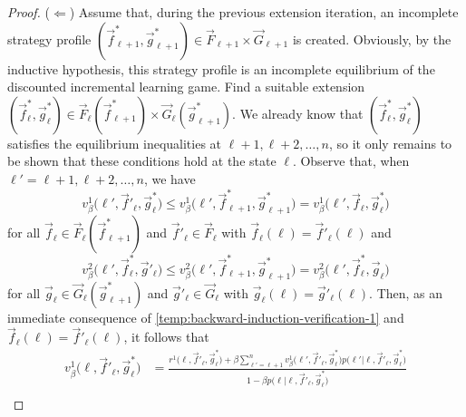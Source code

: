 \begin{proof}
        ($\Longleftarrow$)
        Assume that, during the previous extension iteration, an incomplete strategy profile $(\vec{f}^*_{\ell + 1}, \vec{g}^*_{\ell + 1}) \in \vec{F}_{\ell + 1} \times \vec{G}_{\ell + 1}$ is created.
        Obviously, by the inductive hypothesis, this strategy profile is an incomplete equilibrium of the discounted incremental learning game.
        Find a suitable extension $(\vec{f}^*_\ell, \vec{g}^*_\ell) \in \vec{F}_\ell(\vec{f}^*_{\ell + 1}) \times \vec{G}_\ell(\vec{g}^*_{\ell + 1})$.
        We already know that $(\vec{f}^*_\ell, \vec{g}^*_\ell)$ satisfies the equilibrium inequalities at $\ell + 1, \ell + 2, \ldots, n$, so it only remains to be shown that these conditions hold at the state $\ell$.
        Observe that, when $\ell' = \ell + 1, \ell + 2, \ldots, n$, we have
        \begin{equation}  \label{temp:backward-induction-verification-1}
            v^1_\beta\big(\ell', \vec{f}'_\ell, \vec{g}^*_\ell\big)
                \le v^1_\beta\big(\ell', \vec{f}^*_{\ell + 1}, \vec{g}^*_{\ell + 1}\big)
                = v^1_\beta\big(\ell', \vec{f}_\ell, \vec{g}^*_\ell\big)
        \end{equation}
        for all $\vec{f}_\ell \in \vec{F}_\ell(\vec{f}^*_{\ell + 1})$ and $\vec{f}'_\ell \in \vec{F}_\ell$ with $\vec{f}_\ell(\ell) = \vec{f}'_\ell(\ell)$ and
        \begin{equation}  \label{temp:backward-induction-verification-2}
            v^2_\beta\big(\ell', \vec{f}^*_\ell, \vec{g}'_\ell\big)
                \le v^2_\beta\big(\ell', \vec{f}^*_{\ell + 1}, \vec{g}^*_{\ell + 1}\big)
                = v^2_\beta\big(\ell', \vec{f}^*_\ell, \vec{g}_\ell\big)
        \end{equation}
        for all $\vec{g}_\ell \in \vec{G}_\ell(\vec{g}^*_{\ell + 1})$ and $\vec{g}'_\ell \in \vec{G}_\ell$ with $\vec{g}_\ell(\ell) = \vec{g}'_\ell(\ell)$.
        Then, as an immediate consequence of \eqref{temp:backward-induction-verification-1} and $\vec{f}_\ell(\ell) = \vec{f}'_\ell(\ell)$, it follows that
        \begin{equation}  \label{temp:backward-induction-verification-3}
        \begin{split}
            v^1_\beta\big(\ell, \vec{f}'_\ell, \vec{g}^*_\ell\big)
                & = \frac{r^1\big(\ell, \vec{f}'_\ell, \vec{g}^*_\ell\big) + \beta \sum_{\ell' = \ell + 1}^n v^1_\beta\big(\ell', \vec{f}'_\ell, \vec{g}^*_\ell\big) p\big(\ell' \big| \ell, \vec{f}'_\ell, \vec{g}^*_\ell\big)}{1 - \beta p\big(\ell \big| \ell, \vec{f}'_\ell, \vec{g}^*_\ell\big)} \\

\end{split}
\end{equation}
\end{proof}
